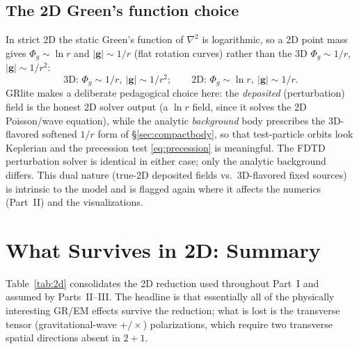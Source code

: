 \documentclass[11pt]{article}
\newcommand{\Phig}{\Phi_g}                 %
\newcommand{\vv}[1]{\mathbf{#1}}           %
\begin{document}
\subsection{The 2D Green's function choice}
\label{sec:greens2d}

In strict 2D the static Green's function of $\nabla^2$ is logarithmic, so a 2D
point mass gives $\Phig\sim\ln r$ and $|\vv{g}|\sim 1/r$ (flat rotation curves)
rather than the 3D $\Phig\sim 1/r$, $|\vv{g}|\sim1/r^2$:
\begin{equation}
  \text{3D: } \Phig\sim 1/r,\ |\vv{g}|\sim1/r^2; \qquad
  \text{2D: } \Phig\sim\ln r,\ |\vv{g}|\sim1/r .
\end{equation}
GRlite makes a deliberate pedagogical choice here: the \emph{deposited}
(perturbation) field is the honest 2D solver output (a $\ln r$ field, since it
solves the 2D Poisson/wave equation), while the analytic \emph{background} body
prescribes the 3D-flavored softened $1/r$ form of \S\ref{sec:compactbody}, so
that test-particle orbits look Keplerian and the precession test
\eqref{eq:precession} is meaningful. The FDTD perturbation solver is identical
in either case; only the analytic background differs. This dual nature (true-2D
deposited fields vs.\ 3D-flavored fixed sources) is intrinsic to the model and
is flagged again where it affects the numerics (Part~II) and the visualizations.

\section{What Survives in 2D: Summary}
\label{sec:2dsummary}

Table~\ref{tab:2d} consolidates the 2D reduction used throughout Part~I and
assumed by Parts~II--III. The headline is that essentially all of the
physically interesting GR/EM effects survive the reduction; what is lost is the
transverse tensor (gravitational-wave $+/\times$) polarizations, which require
two transverse spatial directions absent in $2{+}1$.
\end{document}
